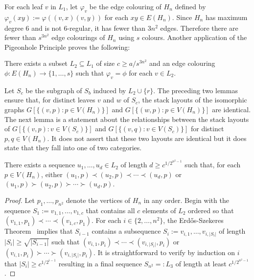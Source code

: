 \documentclass[kpfonts]{patmorin}
\renewcommand{\ge}{\geqslant}
\begin{document}

For each leaf $v$ in $L_1$, let $\varphi_v$ be the edge colouring of $H_n$ defined by $\varphi_v(xy):=\varphi((v,x)(v,y))$ for each $xy\in E(H_n)$. Since $H_n$ has maximum degree $6$ and is not 6-regular, it has fewer than $3n^2$ edges.  Therefore there are fewer than $s^{3n^2}$ edge colourings of $H_n$ using $s$ colours.  Another application of the Pigeonhole Principle proves the following:

\begin{lem}\label{uniform_colour}
    There exists a subset $L_2\subseteq L_1$ of size $c\ge a/s^{3n^2}$
    and an edge colouring $\phi:E(H_n)\to\{1,\ldots,s\}$ such that $\varphi_v=\phi$ for each $v\in L_2$.
\end{lem}


Let $S_{c}$ be the subgraph of $S_b$ induced by $L_2\cup\{r\}$. The preceding two lemmas ensure that, for distinct leaves $v$ and $w$ of $S_{c}$, the stack layouts of the isomorphic graphs $G[\{(v,p):p\in V(H_n)\}]$ and $G[\{(w,p):p\in V(H_n)\}]$ are identical. The next lemma is a statement about the relationships between the stack layouts of $G[\{(v,p):v\in V(S_{c})\}]$ and $G[\{(v,q):v\in V(S_{c})\}]$ for  distinct $p,q\in V(H_n)$.  It does not assert that these two layouts are identical but it does state that they fall into one of two categories.

\begin{lem}\label{forward_or_backward}
    There exists a sequence $u_1,\ldots,u_{d}\in L_2$ of length $d\ge c^{1/2^{n^2-1}}$ such that, for each $p\in V(H_n)$, either  $(u_1,p)\prec (u_2,p)\prec\cdots\prec (u_{d},p)$ or $(u_1,p)\succ (u_2,p)\succ\cdots\succ (u_{d},p)$.
\end{lem}

\begin{proof}
    Let $p_1,\ldots,p_{n^2}$ denote the vertices of $H_n$ in any order.
    Begin with the sequence $S_1:=v_{1,1},\ldots,v_{1,c}$ that contains all $c$ elements of $L_2$ ordered so that $(v_{1,1},p_1)\prec\cdots\prec(v_{1,c},p_1)$.  For each $i\in\{2,\ldots,n^2\}$, the Erd\H{o}s-Szekeres Theorem~\citep{ES35} implies that $S_{i-1}$ contains a subsequence $S_i:=v_{i,1},\ldots,v_{i,|S_i|}$ of length $|S_i|\ge \sqrt{|S_{i-1}|}$ such that $(v_{i,1},p_i)\prec\cdots\prec(v_{i,|S_i|},p_i)$ or $(v_{i,1},p_i)\succ\cdots\succ(v_{i,|S_i|},p_i)$.  It is straightforward to verify by induction on $i$ that $|S_i| \ge c^{1/2^{i-1}}$ resulting in a final sequence $S_{n^2}=:L_3$ of length at least $c^{1/2^{n^2-1}}$.
\end{proof}
\end{document}
